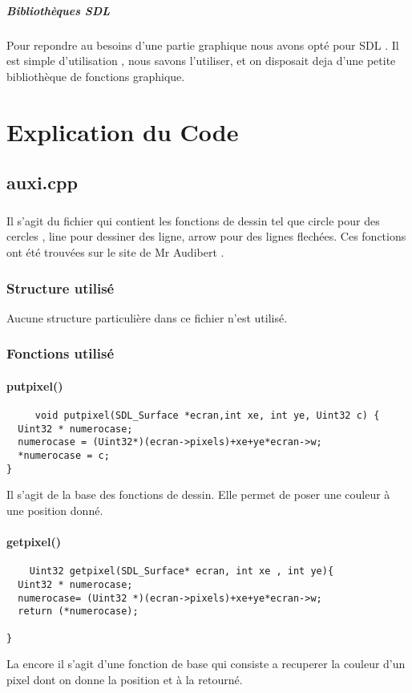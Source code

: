 \documentclass[a4paper,10pt]{report}
\begin{document}
	 \paragraph{Bibliothèques SDL}
	  Pour repondre au besoins d'une partie graphique nous avons opté pour SDL . Il est simple d'utilisation , nous savons l'utiliser,
	  et on disposait deja d'une petite bibliothèque de fonctions graphique.
\chapter{Explication du Code}
  \section{auxi.cpp}
    \paragraph{}
      Il s'agit du fichier qui contient les fonctions de dessin tel que circle pour des cercles , line pour dessiner des ligne, arrow pour des lignes flechées.
      Ces fonctions ont été trouvées sur le site de Mr Audibert .
    \subsection{Structure utilisé}
     Aucune structure particulière dans ce fichier n'est utilisé.
    \subsection{Fonctions utilisé}
     \subsubsection{putpixel()}
      \begin{scriptsize}
	\begin{verbatim}
	 void putpixel(SDL_Surface *ecran,int xe, int ye, Uint32 c) {
  Uint32 * numerocase;
  numerocase = (Uint32*)(ecran->pixels)+xe+ye*ecran->w;
  *numerocase = c;
}
	\end{verbatim}
	  \end{scriptsize}
      Il s'agit de la base des fonctions de dessin. Elle permet de poser une couleur à une position donné.\\
    \subsubsection{getpixel()}  
       \begin{scriptsize}
	\begin{verbatim}
	Uint32 getpixel(SDL_Surface* ecran, int xe , int ye){
  Uint32 * numerocase;
  numerocase= (Uint32 *)(ecran->pixels)+xe+ye*ecran->w;
  return (*numerocase);

}	
	\end{verbatim}
      \end{scriptsize}
      La encore il s'agit d'une fonction de base qui consiste a recuperer la couleur d'un pixel dont on donne la position et à la retourné.\\
      
\end{document}
